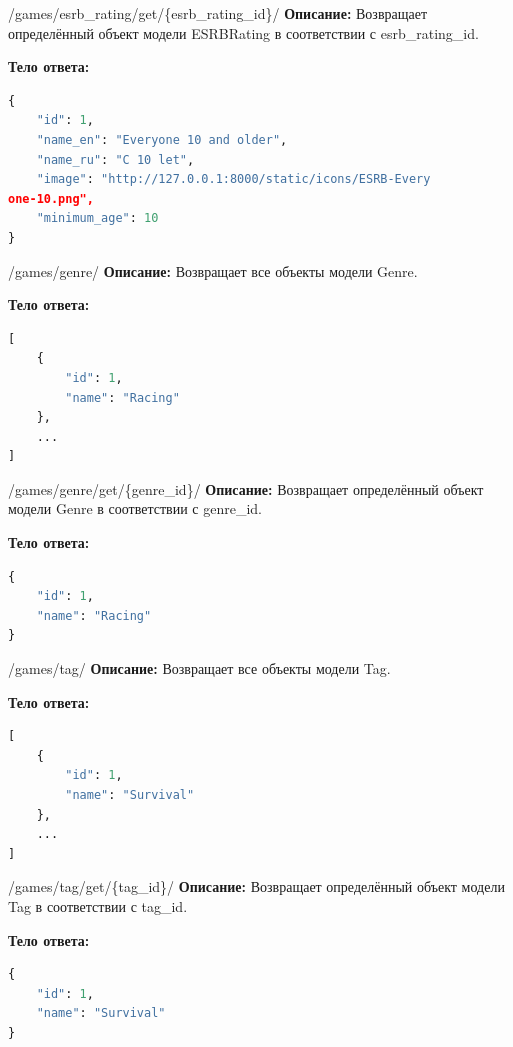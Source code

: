 \documentclass[a4paper,14pt]{extarticle}
\begin{document}
	\begin{getapi}{/games/esrb\_rating/get/\{esrb\_rating\_id\}/}
		\textbf{Описание:} Возвращает определённый объект модели ESRBRating в соответствии с esrb\_rating\_id.\medskip
		
		\textbf{Тело ответа:}
		\begin{lstlisting}[language=Python]
{
    "id": 1,
    "name_en": "Everyone 10 and older",
    "name_ru": "C 10 let",
    "image": "http://127.0.0.1:8000/static/icons/ESRB-Every
one-10.png",
    "minimum_age": 10
}
		\end{lstlisting}
	\end{getapi}
	
	\begin{getapi}{/games/genre/}
		\textbf{Описание:} Возвращает все объекты модели Genre.\medskip
		
		\textbf{Тело ответа:}
		\begin{lstlisting}[language=Python]
[
    {
        "id": 1,
        "name": "Racing"
    },
    ...
]
		\end{lstlisting}
	\end{getapi}
	
	\begin{getapi}{/games/genre/get/\{genre\_id\}/}
		\textbf{Описание:} Возвращает определённый объект модели Genre в соответствии с genre\_id.\medskip
		
		\textbf{Тело ответа:}
		\begin{lstlisting}[language=Python]
{
    "id": 1,
    "name": "Racing"
}
		\end{lstlisting}
	\end{getapi}
	
	\begin{getapi}{/games/tag/}
		\textbf{Описание:} Возвращает все объекты модели Tag.\medskip
		
		\textbf{Тело ответа:}
		\begin{lstlisting}[language=Python]
[
    {
        "id": 1,
        "name": "Survival"
    },
    ...
]
		\end{lstlisting}
	\end{getapi}
	
	\begin{getapi}{/games/tag/get/\{tag\_id\}/}
		\textbf{Описание:} Возвращает определённый объект модели Tag в соответствии с tag\_id.\medskip
		
		\textbf{Тело ответа:}
		\begin{lstlisting}[language=Python]
{
    "id": 1,
    "name": "Survival"
}
		\end{lstlisting}
	\end{getapi}
	
\end{document}
